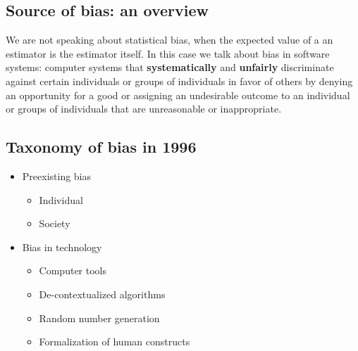 \subsection{Source of bias: an overview}
We are not speaking about statistical bias, when the expected value of a an estimator is the estimator itself. In this case we talk about bias in software systems: computer systems that \textbf{systematically} and \textbf{unfairly} discriminate against certain individuals or groups of individuals in favor of others by denying an opportunity for a good or assigning an undesirable outcome to an individual or groups of individuals that are unreasonable or inappropriate.
\subsection{Taxonomy of bias in 1996}
\begin{itemize}
    \item Preexisting bias
    \begin{itemize}
        \item Individual
        \item Society 
    \end{itemize}
    \item Bias in technology
    \begin{itemize}
        \item Computer tools
        \item De-contextualized algorithms
        \item Random number generation
        \item Formalization of human constructs 
    \end{itemize}
\end{itemize}
